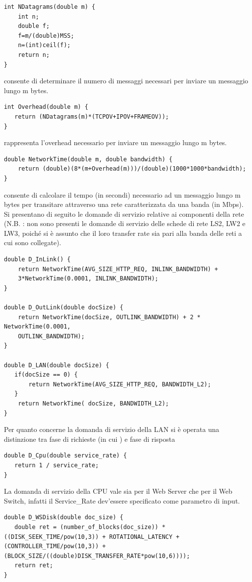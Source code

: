 \begin{lstlisting}
int NDatagrams(double m) { 
	int n; 
	double f; 
	f=m/(double)MSS;
	n=(int)ceil(f); 
	return n; 
} 
\end{lstlisting}
 consente di determinare il numero di messaggi necessari per inviare un messaggio lungo m bytes.
\begin{lstlisting}
int Overhead(double m) { 
   return (NDatagrams(m)*(TCPOV+IPOV+FRAMEOV)); 
}
\end{lstlisting}
 rappresenta l'overhead necessario per inviare un messaggio lungo m bytes.
\begin{lstlisting}
double NetworkTime(double m, double bandwidth) { 
	return (double)(8*(m+Overhead(m)))/(double)(1000*1000*bandwidth); 
}
\end{lstlisting}
 consente di calcolare il tempo (in secondi) necessario ad un messaggio lungo m bytes per transitare attraverso una rete caratterizzata da una banda  (in Mbps).
Si presentano di seguito le domande di servizio relative ai componenti della rete (N.B. : non sono presenti le domande di servizio delle schede di rete LS2, LW2 e LW3, poiché si è assunto che il loro transfer rate sia pari alla banda delle reti a cui sono collegate).
\begin{lstlisting}
double D_InLink() { 
    return NetworkTime(AVG_SIZE_HTTP_REQ, INLINK_BANDWIDTH) +    
    3*NetworkTime(0.0001, INLINK_BANDWIDTH); 
} 

double D_OutLink(double docSize) { 
    return NetworkTime(docSize, OUTLINK_BANDWIDTH) + 2 * NetworkTime(0.0001,   
    OUTLINK_BANDWIDTH); 
} 

double D_LAN(double docSize) { 
   if(docSize == 0) { 
       return NetworkTime(AVG_SIZE_HTTP_REQ, BANDWIDTH_L2); 
   } 
    return NetworkTime( docSize, BANDWIDTH_L2); 
} 
\end{lstlisting}
Per quanto concerne la domanda di servizio della LAN si è operata una distinzione tra fase di richieste (in cui ) e fase di risposta
\begin{lstlisting}
double D_Cpu(double service_rate) { 
   return 1 / service_rate; 
}
\end{lstlisting}
La domanda di servizio della CPU vale sia per il Web Server che per il Web Switch, infatti il Service\_Rate dev'essere specificato come parametro di input.
\begin{lstlisting}
double D_WSDisk(double doc_size) { 
   double ret = (number_of_blocks(doc_size)) * ((DISK_SEEK_TIME/pow(10,3)) + ROTATIONAL_LATENCY + (CONTROLLER_TIME/pow(10,3)) + (BLOCK_SIZE/((double)DISK_TRANSFER_RATE*pow(10,6)))); 
   return ret; 
} 
\end{lstlisting}
